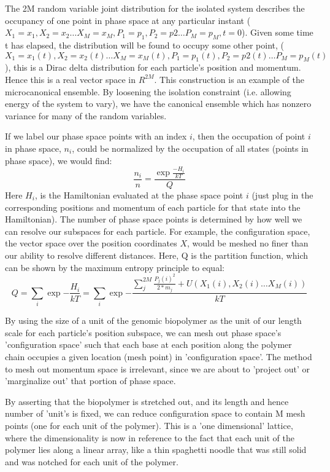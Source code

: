   The 2M random variable joint distribution for the isolated system describes the occupancy of one point in phase space at any particular instant ($X_1=x_1,X_2=x_2\dotsc X_M=x_M, P_1=p_1,P_2=p2\dotsc P_M= p_M,t=0$).  Given some time t has elapsed, the distribution will be found to occupy some other point, ($X_1=x_1(t),X_2=x_2(t)\dotsc X_M=x_M(t), P_1=p_1(t),P_2=p2(t)\dotsc P_M=p_M(t)$), this is a Dirac delta distribution for each particle's position and momentum\cite{vankampen}.  Hence this is a real vector space in $R^{2M}$.
     This construction is an example of the microcanonical ensemble.  By loosening the isolation constraint (i.e. allowing energy of the system to vary), we have the canonical ensemble which has nonzero variance for many of the random variables.

 If we label our phase space points with an index $i$, then the occupation of point $i$ in phase space, $n_i$, could be normalized by the occupation of all states (points in phase space), we would find:
    \begin{equation}\label{}
   \frac{ n_i}{n} =\frac{ \exp\frac{-H_i}{kT} }{ Q }
  \end{equation}
  Here $H_i$, is the Hamiltonian evaluated at the phase space point $i$ (just plug in the corresponding positions and momentum of each particle for that state into the Hamiltonian).  The number of phase space points is determined by how well we can resolve our subspaces for each particle.  For example, the configuration space, the vector space over the position coordinates $X$, would be meshed no finer than our ability to resolve different distances.  Here, Q is the partition function, which can be shown by the maximum entropy principle to equal:
  \begin{equation}\label{canon}
     Q= \sum_i \exp{-\frac{H_i}{kT}} = \sum_i \exp{-\frac{ \sum_j^{2M} \frac{P_j(i)^2}{2*m_j} + U(X_1(i), X_2(i)\dotsc X_M(i))}{kT} }
  \end{equation}

By using the size of a unit of the genomic biopolymer as the unit of our length scale for each particle's position subspace, we can mesh out phase space's 'configuration space' such that each base at each position along the polymer chain occupies a given location (mesh point) in 'configuration space'.  The method to mesh out momentum space is irrelevant, since we are about to 'project out' or 'marginalize out' that portion of phase space.  

By asserting that the biopolymer is stretched out, and its length and hence number of 'unit's is fixed, we can reduce configuration space to contain M mesh points (one for each unit of the polymer).  This is a 'one dimensional' lattice, where the dimensionality is now in reference to the fact that each unit of the polymer lies along a linear array, like a thin spaghetti noodle that was still solid and was notched for each unit of the polymer.

